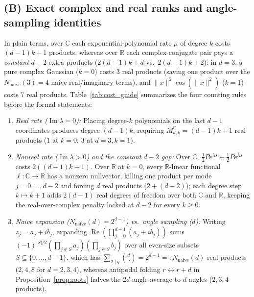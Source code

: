 \documentclass[11pt,a4paper]{article}
\theoremstyle{plain}
\theoremstyle{definition}
\newcommand{\R}{\mathbb{R}}
\newcommand{\C}{\mathbb{C}}
\newcommand{\Nnaive}{N_{\mathrm{naive}}}
\DeclareMathOperator{\RePart}{Re}
\DeclareMathOperator{\ImPart}{Im}
\begin{document}
\subsection{(B) Exact complex and real ranks and angle-sampling identities}\label{sec:intuition}

In plain terms, over $\C$ each exponential-polynomial rate $\mu$ of degree $k$ costs $(d - 1)k + 1$ products, whereas over $\R$ each complex-conjugate pair pays a \emph{constant} $d - 2$ extra products ($2(d - 1)k + d$ vs.\ $2(d - 1)k + 2$): in $d = 3$, a pure complex Gaussian ($k = 0$) costs $3$ real products (saving one product over the $\Nnaive(3) = 4$ naive real/imaginary terms), and $\|x\|^2\cos(\|x\|^2)$ ($k = 1$) costs $7$ real products. Table~\ref{tab:cost_guide} summarizes the four counting rules before the formal statements:
\begin{enumerate}[leftmargin=2em,itemsep=1pt]
  \item \emph{Real rate ($\ImPart\lambda = 0$):} Placing degree-$k$ polynomials on the last $d - 1$ coordinates produces degree $(d - 1)k$, requiring $M_{d,k}^{\C} = (d - 1)k + 1$ real products ($1$ at $k = 0$; $3$ at $d = 3, k = 1$).
  \item \emph{Nonreal rate ($\ImPart\lambda > 0$) and the constant $d - 2$ gap:} Over $\C$, $\frac{1}{2}P e^{\lambda s} + \frac{1}{2}\overline{P}e^{\bar\lambda s}$ costs $2((d - 1)k + 1)$. Over $\R$ at $k = 0$, every $\R$-linear functional $\ell : \C \to \R$ has a nonzero nullvector, killing one product per mode $j = 0,\dots,d - 2$ and forcing $d$ real products ($2 + (d - 2)$); each degree step $k \mapsto k + 1$ adds $2(d - 1)$ real degrees of freedom over both $\C$ and $\R$, keeping the real-over-complex penalty locked at $d - 2$ for every $k \ge 0$.
  \item \emph{Naive expansion ($\Nnaive(d) = 2^{d-1}$) vs.\ angle sampling ($d$):} Writing $z_j = a_j + i b_j$, expanding $\RePart(\prod_{j=0}^{d-1}(a_j + i b_j))$ sums $(-1)^{|S|/2}(\prod_{j\notin S} a_j)(\prod_{j\in S} b_j)$ over all even-size subsets $S \subseteq \{0,\dots,d-1\}$, which has $\sum_{2 \mid q}\binom{d}{q} = 2^{d-1} =: \Nnaive(d)$ real products ($2, 4, 8$ for $d = 2, 3, 4$), whereas antipodal folding $r \leftrightarrow r + d$ in Proposition~\ref{prop:roots} halves the $2d$-angle average to $d$ angles ($2, 3, 4$ products).
\end{enumerate}
\end{document}

